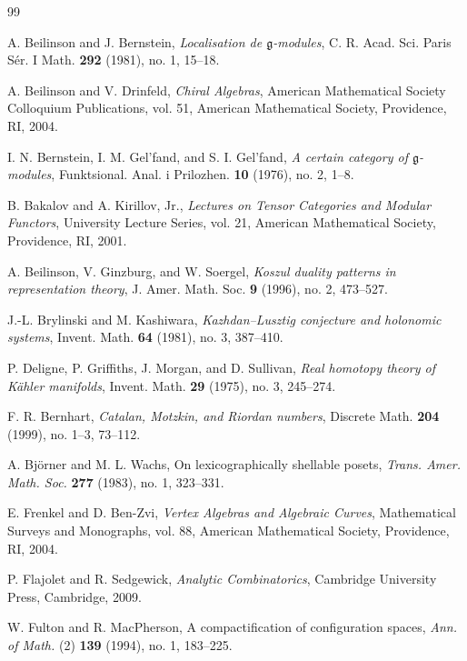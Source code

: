 \begin{thebibliography}{99}

 A. Beilinson and J. Bernstein, \emph{Localisation de $\mathfrak{g}$-modules}, C. R. Acad. Sci. Paris S\'er. I Math. \textbf{292} (1981), no. 1, 15--18.

 A. Beilinson and V. Drinfeld, \emph{Chiral Algebras}, American Mathematical Society Colloquium Publications, vol. 51, American Mathematical Society, Providence, RI, 2004.

 I. N. Bernstein, I. M. Gel'fand, and S. I. Gel'fand, \emph{A certain category of $\mathfrak{g}$-modules}, Funktsional. Anal. i Prilozhen. \textbf{10} (1976), no. 2, 1--8.

 B. Bakalov and A. Kirillov, Jr., \emph{Lectures on Tensor Categories and Modular Functors}, University Lecture Series, vol. 21, American Mathematical Society, Providence, RI, 2001.

 A. Beilinson, V. Ginzburg, and W. Soergel, \emph{Koszul duality patterns in representation theory}, J. Amer. Math. Soc. \textbf{9} (1996), no. 2, 473--527.

 J.-L. Brylinski and M. Kashiwara, \emph{Kazhdan--Lusztig conjecture and holonomic systems}, Invent. Math. \textbf{64} (1981), no. 3, 387--410.

 P. Deligne, P. Griffiths, J. Morgan, and D. Sullivan, \emph{Real homotopy theory of K\"ahler manifolds}, Invent. Math. \textbf{29} (1975), no. 3, 245--274.

 F. R. Bernhart, \emph{Catalan, Motzkin, and Riordan numbers}, Discrete Math. \textbf{204} (1999), no. 1--3, 73--112.

 A. Björner and M. L. Wachs, On lexicographically shellable posets, \emph{Trans. Amer. Math. Soc.} \textbf{277} (1983), no. 1, 323--331.
 
 E. Frenkel and D. Ben-Zvi, \emph{Vertex Algebras and Algebraic Curves}, Mathematical Surveys and Monographs, vol. 88, American Mathematical Society, Providence, RI, 2004.
 
 P. Flajolet and R. Sedgewick, \emph{Analytic Combinatorics}, Cambridge University Press, Cambridge, 2009.

 W. Fulton and R. MacPherson, A compactification of configuration spaces, \emph{Ann. of Math.} (2) \textbf{139} (1994), no. 1, 183--225.
 


\end{thebibliography}
